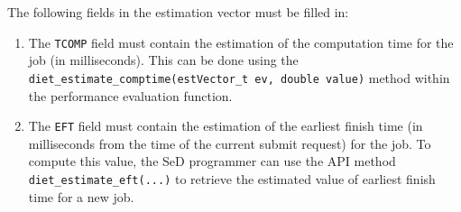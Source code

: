 The following fields in the estimation vector must be filled in:
\begin{enumerate}
\item The \texttt{TCOMP} field must contain the estimation of the
computation time for the job (in milliseconds). This can be done using the
\texttt{diet\_estimate\_comptime(estVector\_t ev, double value)} method
within the performance evaluation function.
\item The \texttt{EFT} field must contain the estimation of the
earliest finish time (in milliseconds from the time of the current submit
request) for the job. To compute this value, the SeD programmer can use
the API method \\
\texttt{diet\_estimate\_eft(...)} to retrieve the
estimated value of earliest finish time for a new job.
\end{enumerate}

%
%
%
%


